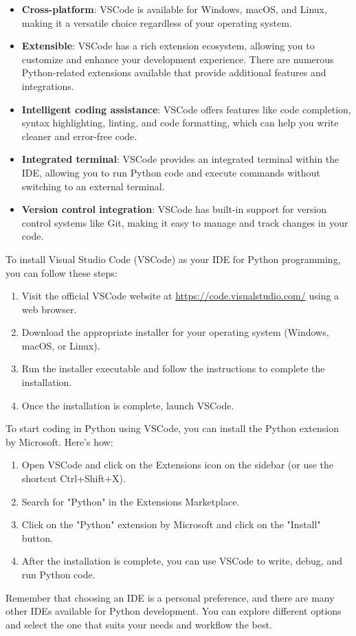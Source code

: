 \documentclass[12pt]{book}
\begin{document}
\begin{itemize}
  \item \textbf{Cross-platform}: VSCode is available for Windows, macOS, and Linux, making it a versatile choice regardless of your operating system.
  \item \textbf{Extensible}: VSCode has a rich extension ecosystem, allowing you to customize and enhance your development experience. There are numerous Python-related extensions available that provide additional features and integrations.
  \item \textbf{Intelligent coding assistance}: VSCode offers features like code completion, syntax highlighting, linting, and code formatting, which can help you write cleaner and error-free code.
  \item \textbf{Integrated terminal}: VSCode provides an integrated terminal within the IDE, allowing you to run Python code and execute commands without switching to an external terminal.
  \item \textbf{Version control integration}: VSCode has built-in support for version control systems like Git, making it easy to manage and track changes in your code.
\end{itemize}

To install Visual Studio Code (VSCode) as your IDE for Python programming, you can follow these steps:


\begin{enumerate}
  \item Visit the official VSCode website at \url{https://code.visualstudio.com/} using a web browser.
  \item Download the appropriate installer for your operating system (Windows, macOS, or Linux).
  \item Run the installer executable and follow the instructions to complete the installation.
  \item Once the installation is complete, launch VSCode.
\end{enumerate}

To start coding in Python using VSCode, you can install the Python extension by Microsoft. Here's how:

\begin{enumerate}
  \item Open VSCode and click on the Extensions icon on the sidebar (or use the shortcut Ctrl+Shift+X).
  \item Search for "Python" in the Extensions Marketplace.
  \item Click on the "Python" extension by Microsoft and click on the "Install" button.
  \item After the installation is complete, you can use VSCode to write, debug, and run Python code.
\end{enumerate}
Remember that choosing an IDE is a personal preference, and there are many other IDEs available for Python development. You can explore different options and select the one that suits your needs and workflow the best.
\end{document}
